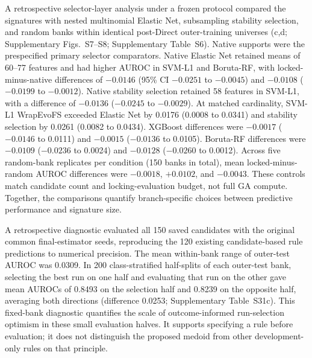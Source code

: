 A retrospective selector-layer analysis under a frozen protocol compared the signatures with nested multinomial Elastic Net, subsampling stability selection, and random banks within identical post-Direct outer-training universes (c,d; Supplementary Figs.~S7--S8; Supplementary Table~S6). Native supports were the prespecified primary selector comparators. Native Elastic Net retained means of 60--77 features and had higher AUROC in SVM-L1 and Boruta-RF, with locked-minus-native differences of $-0.0146$ (95\% CI $-0.0251$ to $-0.0045$) and $-0.0108$ ($-0.0199$ to $-0.0012$). Native stability selection retained 58 features in SVM-L1, with a difference of $-0.0136$ ($-0.0245$ to $-0.0029$). At matched cardinality, SVM-L1 WrapEvoFS exceeded Elastic Net by 0.0176 (0.0008 to 0.0341) and stability selection by 0.0261 (0.0082 to 0.0434). XGBoost differences were $-0.0017$ ($-0.0146$ to 0.0111) and $-0.0015$ ($-0.0136$ to 0.0105). Boruta-RF differences were $-0.0109$ ($-0.0236$ to 0.0024) and $-0.0128$ ($-0.0260$ to 0.0012). Across five random-bank replicates per condition (150 banks in total), mean locked-minus-random AUROC differences were $-0.0018$, $+0.0102$, and $-0.0043$. These controls match candidate count and locking-evaluation budget, not full GA compute. Together, the comparisons quantify branch-specific choices between predictive performance and signature size.

A retrospective diagnostic evaluated all 150 saved candidates with the original common final-estimator seeds, reproducing the 120 existing candidate-based rule predictions to numerical precision. The mean within-bank range of outer-test AUROC was 0.0309. In 200 class-stratified half-splits of each outer-test bank, selecting the best run on one half and evaluating that run on the other gave mean AUROCs of 0.8493 on the selection half and 0.8239 on the opposite half, averaging both directions (difference 0.0253; Supplementary Table~S31c). This fixed-bank diagnostic quantifies the scale of outcome-informed run-selection optimism in these small evaluation halves. It supports specifying a rule before evaluation; it does not distinguish the proposed medoid from other development-only rules on that principle.

